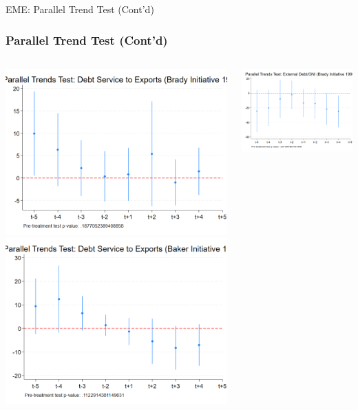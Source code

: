 \documentclass{beamer}
\begin{document}
\begin{frame}{EME: Parallel Trend Test (Cont'd)}
  \frametitle{Parallel Trend Test (Cont'd)}
  \begin{columns}[T] %
    \begin{column}{0.45\textwidth}
      \centering
      \includegraphics[width=0.9\linewidth]{figures/PT_Brady_DebtServ.png}
      \includegraphics[width=0.9\linewidth]{figures/PT_Baker_DebtServ.png}
    \end{column}
    \begin{column}{0.45\textwidth}
      \centering
      \includegraphics[width=0.9\linewidth]{figures/PT_Brady_ExtDebt.png}

\end{column}
\end{columns}
\end{frame}
\end{document}
